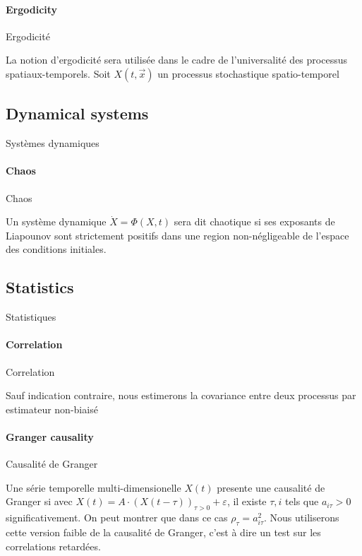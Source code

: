 \paragraph{Ergodicity}{Ergodicité}

La notion d'ergodicité sera utilisée dans le cadre de l'universalité des processus spatiaux-temporels. Soit $X(t,\vec{x})$ un processus stochastique spatio-temporel



\subsection*{Dynamical systems}{Systèmes dynamiques}

\paragraph{Chaos}{Chaos}


Un système dynamique $\dot{X}=\Phi(X,t)$ sera dit chaotique si ses exposants de Liapounov sont strictement positifs dans une region non-négligeable de l'espace des conditions initiales.



\subsection*{Statistics}{Statistiques}


\paragraph{Correlation}{Correlation}

Sauf indication contraire, nous estimerons la covariance entre deux processus par estimateur non-biaisé




\paragraph{Granger causality}{Causalité de Granger}


Une série temporelle multi-dimensionelle $X(t)$ presente une causalité de Granger si avec $X(t) = A\cdot \left(X(t-\tau)\right)_{\tau >0} + \varepsilon$, il existe $\tau,i$ tels que $a_{i\tau}>0$ significativement. On peut montrer que dans ce cas $\rho_{\tau}=a_{i\tau}^2$. Nous utiliserons cette version faible de la causalité de Granger, c'est à dire un test sur les correlations retardées.




